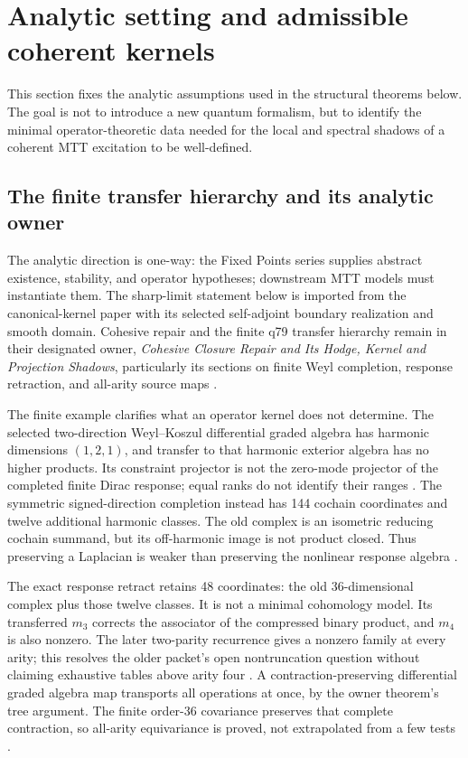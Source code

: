 \documentclass[11pt]{article}
\begin{document}
\section{Analytic setting and admissible coherent kernels}
\label{sec:analytic-setting}

This section fixes the analytic assumptions used in the structural theorems below. The goal is
not to introduce a new quantum formalism, but to identify the minimal operator-theoretic data
needed for the local and spectral shadows of a coherent MTT excitation to be well-defined.

\subsection{The finite transfer hierarchy and its analytic owner}
\label{subsec:finite-transfer-consumer}
The analytic direction is one-way: the Fixed Points series supplies
abstract existence, stability, and operator hypotheses; downstream MTT
models must instantiate them. The sharp-limit statement below is imported
from the canonical-kernel paper with its selected self-adjoint boundary
realization and smooth domain. Cohesive repair and the finite q79 transfer
hierarchy remain in their designated owner, \emph{Cohesive Closure Repair
and Its Hodge, Kernel and Projection Shadows}, particularly its sections
on finite Weyl completion, response retraction, and all-arity source maps
\cite{MTTFPSpine,MTTKernel,MTTCohesiveTransfer}.

The finite example clarifies what an operator kernel does not determine.
The selected two-direction Weyl--Koszul differential graded algebra has
harmonic dimensions \((1,2,1)\), and transfer to that harmonic exterior
algebra has no higher products. Its constraint projector is not the
zero-mode projector of the completed finite Dirac response; equal ranks
do not identify their ranges \cite{FiniteWeylHodge}.
The symmetric signed-direction completion instead has 144 cochain
coordinates and twelve additional harmonic classes. The old complex is
an isometric reducing cochain summand, but its off-harmonic image is not
product closed. Thus preserving a Laplacian is weaker than preserving
the nonlinear response algebra \cite{SymmetricWeyl}.

The exact response retract retains 48 coordinates: the old 36-dimensional
complex plus those twelve classes. It is not a minimal cohomology model.
Its transferred \(m_3\) corrects the associator of the compressed binary
product, and \(m_4\) is also nonzero. The later two-parity recurrence gives
a nonzero family at every arity; this resolves the older packet's open
nontruncation question without claiming exhaustive tables above arity
four \cite{ResponseMthree,ResponseMfour,HigherTransfer}.
A contraction-preserving differential graded algebra map transports all
operations at once, by the owner theorem's tree argument. The finite
order-36 covariance preserves that complete contraction, so all-arity
equivariance is proved, not extrapolated from a few tests
\cite{AllArityTransfer}.
\end{document}
